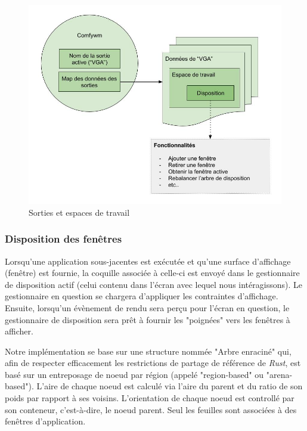 \documentclass[titlepage]{article}
\begin{document}
\begin{figure}[H]
	\centering
	\includegraphics[width=\textwidth]{sorties_et_espaces_de_travail.jpg}
	\caption{Sorties et espaces de travail}
\end{figure}

\subsubsection{Disposition des fenêtres}
\par
Lorsqu'une application sous-jacentes est exécutée et qu'une surface d'affichage
(fenêtre) est fournie, la coquille associée à celle-ci est envoyé dans le
gestionnaire de disposition actif (celui contenu dans l'écran avec lequel nous
intéragissons). Le gestionnaire en question se chargera d'appliquer les
contraintes d'affichage. Ensuite, lorsqu'un évènement de rendu sera perçu pour
l'écran en question, le gestionnaire de disposition sera prêt à fournir les
"poignées" vers les fenêtres à afficher.
\bigskip

\par
Notre implémentation se base sur une structure nommée "Arbre enraciné" qui, afin
de respecter efficacement les restrictions de partage de référence de
\textit{Rust}, est basé sur un entreposage de noeud par région (appelé
"region-based" ou "arena-based"). L'aire de chaque noeud est calculé via l'aire
du parent et du ratio de son poids par rapport à ses voisins. L'orientation de
chaque noeud est controllé par son conteneur, c'est-à-dire, le noeud parent.
Seul les feuilles sont associées à des fenêtres d'application.
\bigskip
\end{document}
